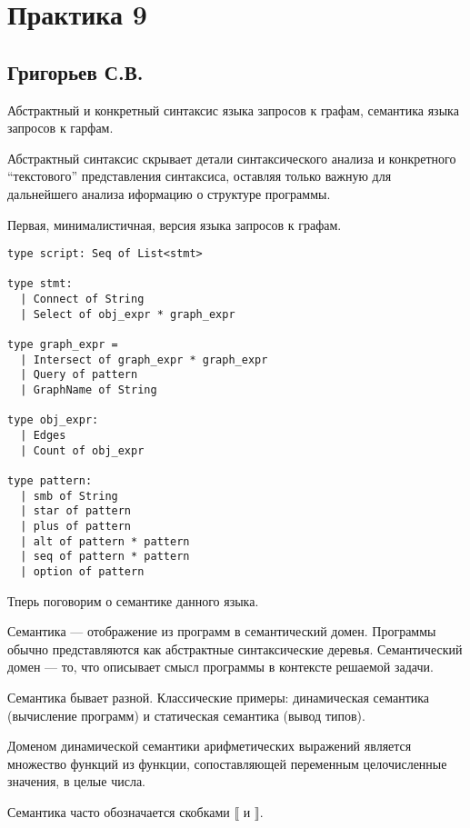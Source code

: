 \section{Практика 9}

\subsection{Григорьев С.В.}

Абстрактный и конкретный синтаксис языка запросов к графам, семантика языка запросов к гарфам.

Абстрактный синтаксис скрывает детали синтаксического анализа и конкретного ``текстового'' представления синтаксиса, оставляя только важную для дальнейшего анализа иформацию о структуре программы. 

Первая, минималистичная, версия языка запросов к графам.

\begin{verbatim}
type script: Seq of List<stmt>

type stmt:
  | Connect of String
  | Select of obj_expr * graph_expr

type graph_expr =
  | Intersect of graph_expr * graph_expr 
  | Query of pattern
  | GraphName of String

type obj_expr:
  | Edges   
  | Count of obj_expr
  
type pattern: 
  | smb of String
  | star of pattern
  | plus of pattern
  | alt of pattern * pattern
  | seq of pattern * pattern
  | option of pattern

\end{verbatim}

\newcommand{\sem}[1]{\llbracket #1 \rrbracket}

Тперь поговорим о семантике данного языка. 

Семантика --- отображение из программ в семантический домен.
Программы обычно представляются как абстрактные синтаксические деревья.
Семантический домен --- то, что описывает смысл программы в контексте решаемой задачи.

Семантика бывает разной.
Классические примеры: динамическая семантика (вычисление программ) и статическая семантика (вывод типов).

Доменом динамической семантики арифметических выражений является множество функций из функции, сопоставляющей переменным целочисленные значения, в целые числа.

Семантика часто обозначается скобками $\llbracket$ и $\rrbracket$.

